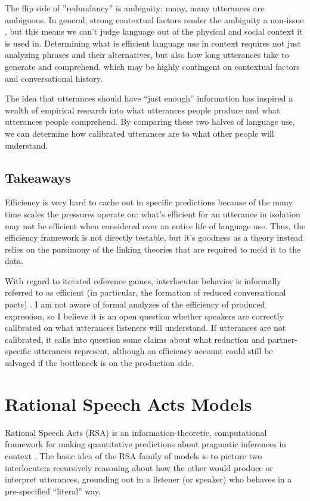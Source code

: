 \documentclass[]{article}
\begin{document}
The flip side of ''redundancy'' is ambiguity: many, many utterances are ambiguous. In general, strong contextual factors render the ambiguity a non-issue \cite{piantadosi2012}, but this means we can't judge language out of the physical and social context it is used in. Determining what is efficient language use in context requires not just analyzing phrases and their alternatives, but also how long utterances take to generate and comprehend, which may be highly contingent on contextual factors and conversational history. 

The idea that utterances should have ``just enough'' information has inspired a wealth of empirical research into what utterances people produce and what utterances people comprehend. By comparing these two halves of language use, we can determine how calibrated utterances are to what other people will understand. 

\subsection{Takeaways}
Efficiency is very hard to cache out in specific predictions because of the many time scales the pressures operate on: what's efficient for an utterance in isolation may not be efficient when considered over an entire life of language use. Thus, the efficiency framework is not directly testable, but it's goodness as a theory instead relies on the parsimony of the linking theories that are required to meld it to the data. 

With regard to iterated reference games, interlocutor behavior is informally referred to as efficient (in particular, the formation of reduced conversational pacts) \citep{TODO}. I am not aware of formal analyzes of the efficiency of produced expression, so I believe it is an open question whether speakers are correctly calibrated on what utterances listeners will understand. If utterances are not calibrated, it calls into question some claims about what reduction and partner-specific utterances represent, although an efficiency account could still be salvaged if the bottleneck is on the production side.

\section{Rational Speech Acts Models}

Rational Speech Acts (RSA) is an information-theoretic, computational framework for making quantitative predictions about pragmatic inferences in context \citep{goodman2016, frank2012a}. The basic idea of the RSA family of models is to picture two interlocuters recursively reasoning about how the other would produce or interpret utterances, grounding out in a listener (or speaker) who behaves in a pre-specified ``literal'' way. 
\end{document}
